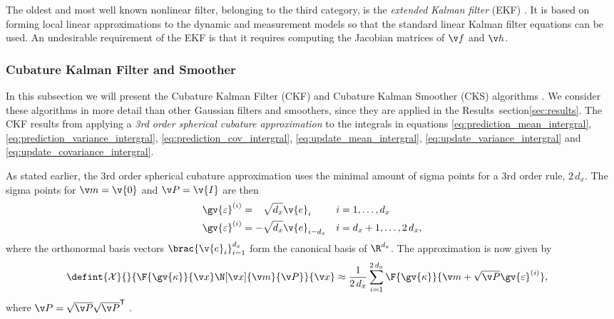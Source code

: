 The oldest and most well known nonlinear filter, belonging to the third category, is
the \emph{extended Kalman filter} (EKF) \parencite{jazwinski1970stochastic}. 
It is based on forming local linear approximations to the dynamic
and measurement models so that the standard linear Kalman filter equations can be used.
An undesirable requirement of the EKF is that it requires computing
the Jacobian matrices of $\f$ and $\h$.

\subsubsection{Cubature Kalman Filter and Smoother}
In this subsection we will present the Cubature Kalman Filter (CKF)
and Cubature Kalman Smoother (CKS) algorithms \parencite{Arasaratnam2011,Arasaratnam2009}.
We consider these algorithms in more detail than other Gaussian filters and smoothers, since
they are applied in the Results~section\ref{sec:results}. The CKF results from
applying a \emph{3rd order spherical cubature approximation} to the integrals 
in equations \eqref{eq:prediction_mean_intergral}, \eqref{eq:prediction_variance_intergral}, \eqref{eq:prediction_cov_intergral},
\eqref{eq:update_mean_intergral}, \eqref{eq:update_variance_intergral} and
\eqref{eq:update_covariance_intergral}.

As stated earlier, the 3rd order spherical cubature approximation uses the minimal amount
of sigma points for a 3rd order rule, $2\,d_x$. The sigma points for $\m=\v{0}$ and $\P=\v{I}$ are then
\begin{align}
	\gv{\varepsilon}^{(i)}& = \hphantom{-}\sqrt{d_x}\v{e}_i &  i&=1,\dots,d_x\\
	\gv{\varepsilon}^{(i)}& = -\sqrt{d_x}\v{e}_{i-d_x} & i&=d_x+1,\dots,2\,d_x,
	\label{eq:ckf_sigma}
\end{align}
where the orthonormal basis vectors $\brac{\v{e}_i}_{i=1}^{d_x}$ form the canonical basis of $\R^{d_x}$. 
The approximation is now given by
\begin{align}
	\defint{\mathcal{X}}{}{\F{\gv{\kappa}}{\x}\N[\x]{\m}{\P}}{\x} &\approx 
	\frac{1}{2\,d_x} \sum_{i=1}^{2\,d_x} \F{\gv{\kappa}}{\m+\sqrt{\P}\gv{\varepsilon}^{(i)}},
	\label{eq:ckf_approx}
\end{align}%
where $\P=\sqrt{\P}\sqrt{\P}^\tr$ \parencite{Sarkka2012a,Arasaratnam2009,Wu2006}.









